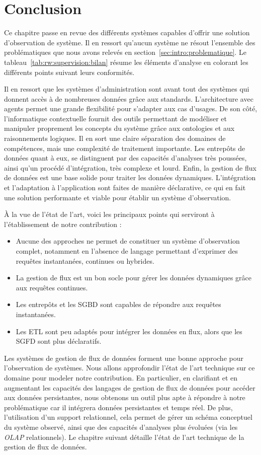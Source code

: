 \section{Conclusion}
Ce chapitre passe en revue des différents systèmes capables d'offrir une solution d'observation de système. Il en ressort qu'aucun système ne résout l'ensemble des problématiques que nous avons relevés en section~\ref{sec:intro:problematique}. Le tableau~\ref{tab:rw:supervision:bilan} résume les éléments d'analyse en colorant les différents points suivant leurs conformités. 

Il en ressort que les systèmes d'administration sont avant tout des systèmes qui donnent accès à de nombreuses données grâce aux standards. L'architecture avec agents permet une grande flexibilité pour s'adapter aux cas d'usages. De son côté, l'informatique contextuelle fournit des outils permettant de modéliser et manipuler proprement les concepts du système grâce aux ontologies et aux raisonnements logiques. Il en sort une claire séparation des domaines de compétences, mais une complexité de traitement importante. Les entrepôts de données quant à eux, se distinguent par des capacités d'analyses très poussées, ainsi qu'un procédé d'intégration, très complexe et lourd. Enfin, la gestion de flux de données est une base solide pour traiter les données dynamiques. L'intégration et l'adaptation à l'application sont faites de manière déclarative, ce qui en fait une solution performante et viable pour établir un système d'observation.

À la vue de l'état de l'art, voici les principaux points qui serviront à l'établissement de notre contribution :
\begin{itemize}
    \item Aucune des approches ne permet de constituer un système d'observation complet, notamment en l'absence de langage permettant d'exprimer des requêtes instantanées, continues ou hybrides.
    \item La gestion de flux est un bon socle pour gérer les données dynamiques grâce aux requêtes continues.
    \item Les entrepôts et les SGBD sont capables de répondre aux requêtes instantanées.
    \item Les ETL sont peu adaptés pour intégrer les données en flux, alors que les SGFD sont plus déclaratifs.
\end{itemize}

Les systèmes de gestion de flux de données forment une bonne approche pour l'observation de systèmes. Nous allons approfondir l'état de l'art technique sur ce domaine pour modeler notre contribution. En particulier, en clarifiant et en augmentant les capacités des langages de gestion de flux de données pour accéder aux données persistantes, nous obtenons un outil plus apte à répondre à notre problématique car il intégrera données persistantes et temps réel. De plus, l'utilisation d'un support relationnel, cela permet de gérer un schéma conceptuel du système observé, ainsi que des capacités d'analyses plus évoluées (via les \textit{OLAP} relationnels). Le chapitre suivant détaille l'état de l'art technique de la gestion de flux de données.

